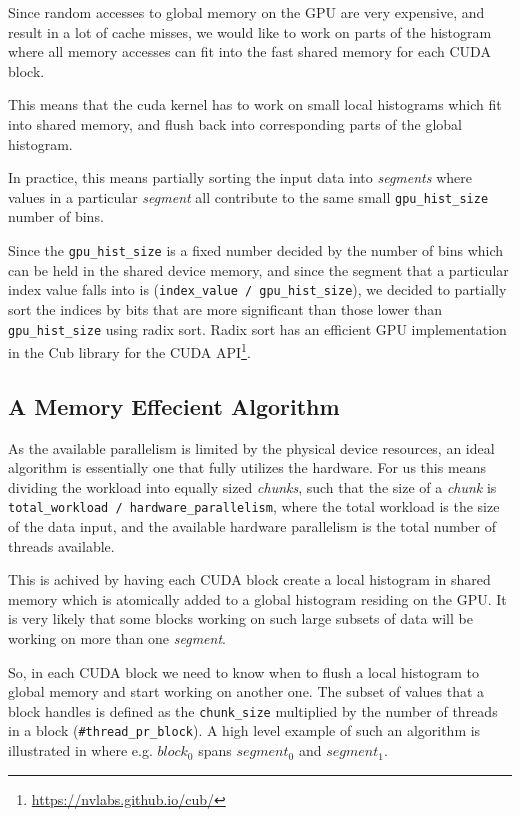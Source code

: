 \documentclass[12pt, a4paper, hidelinks]{article}
\renewcommand{\tt}[1]{\texttt{#1}}
\renewcommand{\it}[1]{\textit{#1}}
\begin{document}
Since random accesses to global memory on the GPU are very
expensive, and result in a lot of cache misses, we would like
to work on parts of the histogram where all memory accesses
can fit into the fast shared memory for each CUDA block.

This means that the cuda kernel has to work on small local histograms
which fit into shared memory, and flush back into corresponding parts of the global histogram.

In practice, this means partially sorting the
input data into \it{segments} where values in a particular \it{segment}
all contribute to the same small \tt{gpu\_hist\_size} number of bins.

Since the \tt{gpu\_hist\_size} is a fixed number
decided by the number of bins which can be held in the shared device memory,
and since the segment that a particular index value falls into
is (\tt{index\_value / gpu\_hist\_size}),
we decided to partially sort the indices by bits that are more significant than those
lower than \tt{gpu\_hist\_size} using radix sort. Radix sort has an efficient GPU
implementation in the Cub library for the CUDA API\footnote{\url{https://nvlabs.github.io/cub/}}.


\subsection{A Memory Effecient Algorithm}
As the available parallelism is limited by the physical device resources,
an ideal algorithm is essentially one that fully utilizes the hardware.
For us this means dividing the workload into
equally sized \it{chunks}, such that the size of a \it{chunk} is
\tt{total\_workload / hardware\_parallelism},
where the total workload is the size of the data input,
and the available hardware parallelism is the total number of threads available.

This is achived by having each CUDA block create a local histogram in shared memory
which is atomically added to a global histogram residing on the GPU.
It is very likely that some blocks working on such large subsets of data will
be working on more than one \it{segment}.

So, in each CUDA block we need to know when to flush a local histogram to global
memory and start working on another one.
The subset of values that a block handles is defined as the \tt{chunk\_size}
multiplied by the number of threads in a block (\tt{\#thread\_pr\_block}).
A high level example of such an algorithm is illustrated in 
where e.g. $block_0$ spans $segment_0$ and $segment_1$.
\end{document}
